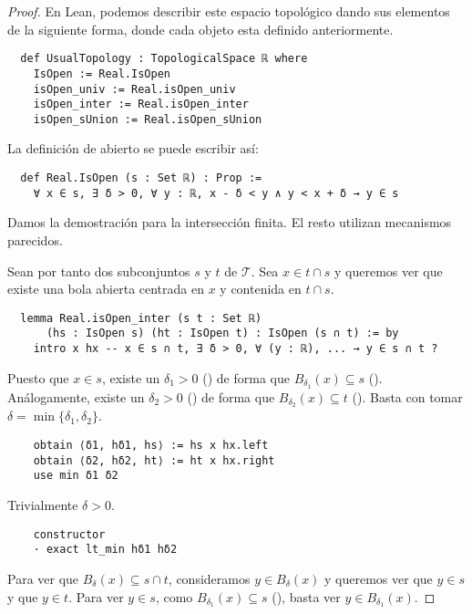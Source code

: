 \begin{proof}
  En Lean, podemos describir este espacio topológico dando sus elementos de la siguiente forma, donde cada objeto esta definido anteriormente.

  
  \begin{lstlisting}
  def UsualTopology : TopologicalSpace ℝ where
    IsOpen := Real.IsOpen
    isOpen_univ := Real.isOpen_univ
    isOpen_inter := Real.isOpen_inter
    isOpen_sUnion := Real.isOpen_sUnion \end{lstlisting}
  
  La definición de abierto se puede escribir así:

  \begin{lstlisting}
  def Real.IsOpen (s : Set ℝ) : Prop :=
    ∀ x ∈ s, ∃ δ > 0, ∀ y : ℝ, x - δ < y ∧ y < x + δ → y ∈ s \end{lstlisting}

  Damos la demostración para la intersección finita. El resto utilizan mecanismos parecidos.

  Sean por tanto dos subconjuntos $s$ y $t$ de $\mathcal{T}$. Sea $x \in t \cap s$ y queremos ver que existe una bola abierta centrada en $x$ y contenida en $t \cap s$.

  \begin{lstlisting}
  lemma Real.isOpen_inter (s t : Set ℝ)
      (hs : IsOpen s) (ht : IsOpen t) : IsOpen (s ∩ t) := by
    intro x hx -- x ∈ s ∩ t, ∃ δ > 0, ∀ (y : ℝ), ... → y ∈ s ∩ t ? \end{lstlisting}

  Puesto que $x \in s$, existe un $\delta_1>0$ () de forma que $B_{\delta_1}(x) \subseteq s$ (). Análogamente, existe un $\delta_2>0$ () de forma que $B_{\delta_2}(x) \subseteq t$ (). Basta con tomar $\delta = \min \{\delta_1, \delta_2\}$.

  \begin{lstlisting}
    obtain ⟨δ1, hδ1, hs⟩ := hs x hx.left
    obtain ⟨δ2, hδ2, ht⟩ := ht x hx.right
    use min δ1 δ2 \end{lstlisting}

  Trivialmente $\delta > 0$.
  
  \begin{lstlisting}
    constructor
    · exact lt_min hδ1 hδ2 \end{lstlisting}

  Para ver que $B_\delta (x) \subseteq s \cap t$, consideramos $y \in B_\delta(x)$ y queremos ver que $y \in s$ y que $y \in t$. Para ver $y \in s$, como $B_{\delta_1}(x) \subseteq s$ (), basta ver $y \in B_{\delta_1}(x)$.


\end{proof}
